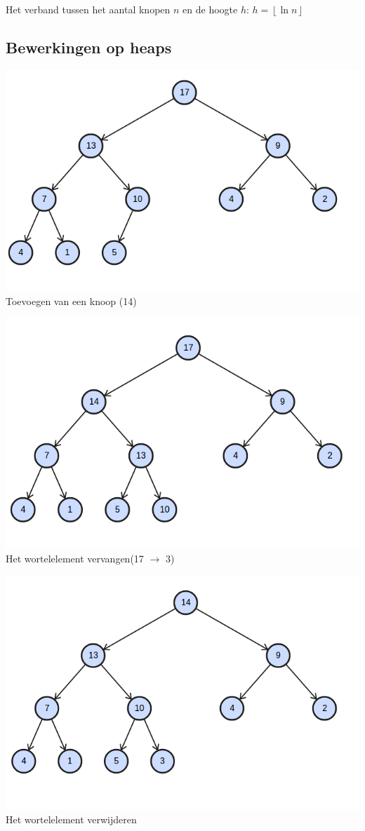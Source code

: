 \documentclass[12pt]{report}
\def\lf{\left\lfloor}
\def\rf{\right\rfloor}
\begin{document}
Het verband tussen het aantal knopen $n$ en de hoogte $h$: $h = \lf \ln n \rf$

\subsection{Bewerkingen op heaps}
\includegraphics[width=\textwidth]{heap_1}
Toevoegen van een knoop (14)

\includegraphics[width=\textwidth]{heap_2}
Het wortelelement vervangen(17 $\rightarrow$ 3)

\includegraphics[width=\textwidth]{heap_3}
Het wortelelement verwijderen
\end{document}
